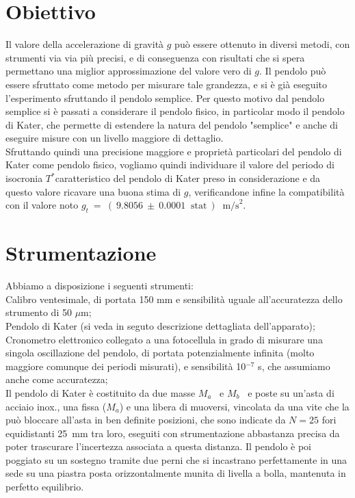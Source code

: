 \documentclass[italian, a4paper, 10pt, twocolumn]{../../style/lab_unige}
\newcommand{\gLab}{$g_t~=~(~9.8056~\pm~0.0001~\text{ stat}~)~\text{ m/s}^2$}
\newcommand{\Ma}{$M_a$}
\newcommand{\Mb}{$M_b$}
\newcommand{\Tiso}{$T^*$\space}
\begin{document}
    \section{Obiettivo}
    \label{section:aim}
    Il valore della accelerazione di gravità $g$ può essere ottenuto in diversi metodi, con strumenti via via più precisi, e di conseguenza con risultati che si spera permettano una miglior approssimazione del valore vero di $g$. Il pendolo può essere sfruttato come metodo per misurare tale grandezza, e si è già eseguito l'esperimento sfruttando il pendolo semplice. Per questo motivo dal pendolo semplice si è passati a considerare il pendolo fisico, in particolar modo il pendolo di Kater, che permette di estendere la natura del pendolo 
    "semplice" e anche di eseguire misure con un livello maggiore di dettaglio.\\
    Sfruttando quindi una precisione maggiore e proprietà particolari del pendolo di Kater come pendolo fisico, vogliamo quindi individuare il valore del periodo di isocronia \Tiso caratteristico del pendolo di Kater preso in considerazione e da questo valore ricavare una buona stima di $g$, verificandone infine la compatibilità con il valore noto \gLab.

    \section{Strumentazione}
    \label{section:strument}
    Abbiamo a disposizione i seguenti strumenti:\\
    Calibro ventesimale, di portata 150 mm e sensibilità uguale all'accuratezza dello strumento di 50 $\mu$m;\\
    Pendolo di Kater (si veda in seguto descrizione dettagliata dell'apparato);\\
    Cronometro elettronico collegato a una fotocellula in grado di misurare una singola oscillazione del pendolo, di portata potenzialmente infinita (molto maggiore comunque dei periodi misurati), e sensibilità 10$^{-7}$ s, che assumiamo anche come accuratezza;\\

    Il pendolo di Kater è costituito da due masse \Ma~ e \Mb~ e poste su un'asta di acciaio inox., una fissa (\Ma) e una libera di muoversi, vincolata da una vite che la può bloccare all'asta in ben definite posizioni, che sono indicate da $N=25$ fori equidistanti 25~mm tra loro, eseguiti con strumentazione abbastanza precisa da poter trascurare l'incertezza associata a questa distanza. Il pendolo è poi poggiato su un sostegno tramite due perni che si incastrano perfettamente in una sede su una piastra posta orizzontalmente munita di livella a bolla, mantenuta in perfetto equilibrio.
\end{document}
